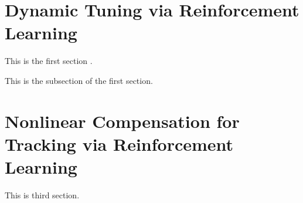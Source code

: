 \section{Dynamic Tuning via Reinforcement Learning} \label{sec:dytun}
This is the first section .

This is the subsection of the first section.


\section{Nonlinear Compensation for Tracking via Reinforcement Learning} \label{sec:nl_comp}
This is third section.

